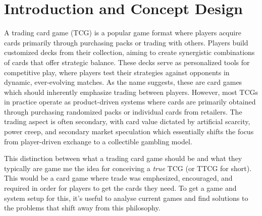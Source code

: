 \chapter{Introduction and Concept Design}

A trading card game (TCG) is a popular game format where players acquire cards primarily through purchasing packs or trading with others. Players build customized decks from their collection, aiming to create synergistic combinations of cards that offer strategic balance. These decks serve as personalized tools for competitive play, where players test their strategies against opponents in dynamic, ever-evolving matches. As the name suggests, these are card games which should inherently emphasize trading between players. However, most TCGs in practice operate as product-driven systems where cards are primarily obtained through purchasing randomized packs or individual cards from retailers. The trading aspect is often secondary, with card value dictated by artificial scarcity, power creep, and secondary market speculation which essentially shifts the focus from player-driven exchange to a collectible gambling model.

This distinction between what a trading card game should be and what they typically are game me the idea for conceiving a \textit{true} TCG (or TTCG for short). This would be a card game where trade was emphesized, encouraged, and required in order for players to get the cards they need. To get a game and system setup for this, it's useful to analyse current games and find solutions to the problems that shift away from this philosophy.

